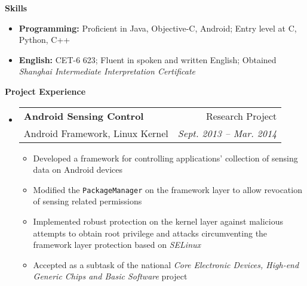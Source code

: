 \documentclass[letterpaper,10pt]{article}
\makeatletter
\newcommand{\resitem}[1]{\item #1 \vspace{-2pt}}
\newcommand{\resheading}[1]{{\large \colorbox{mygrey}{\begin{minipage}{\textwidth}{\textbf{#1 \vphantom{p\^{E}}}}\end{minipage}}}}
\newcommand{\ressubheading}[4]{
\begin{tabular*}{6.5in}{l@{\extracolsep{\fill}}r}
		\textbf{#1} & #2 \\
		#3 & #4 \\
\end{tabular*}\vspace{-6pt}}
\makeatother
\begin{document}
\resheading{{Skills}}
	\begin{itemize}
		\item
            \textbf{Programming:} Proficient in Java, Objective-C, Android; Entry level at C, Python, C++
        \item    
            \textbf{English:} CET-6 623; Fluent in spoken and written English; Obtained  \emph{Shanghai Intermediate Interpretation Certificate}
	\end{itemize} %

\resheading{Project Experience}
	\begin{itemize}
		\item
			\ressubheading{Android Sensing Control}{Research Project}{Android Framework, Linux Kernel}{\emph{Sept. 2013 -- Mar. 2014}}
			{\begin{itemize}
				\resitem{Developed a framework for controlling applications' collection of sensing data on Android devices}
                \resitem{Modified the \texttt{PackageManager} on the framework layer to allow revocation of sensing related permissions}
				\resitem{Implemented robust protection on the kernel layer against malicious attempts to obtain root privilege and attacks circumventing the framework layer protection based on \emph{SELinux}}
				\resitem{Accepted as a subtask of the national \emph{Core Electronic Devices, High-end Generic Chips and Basic Software} project}
			\end{itemize}
			}	
	\end{itemize}
			
\end{document}
